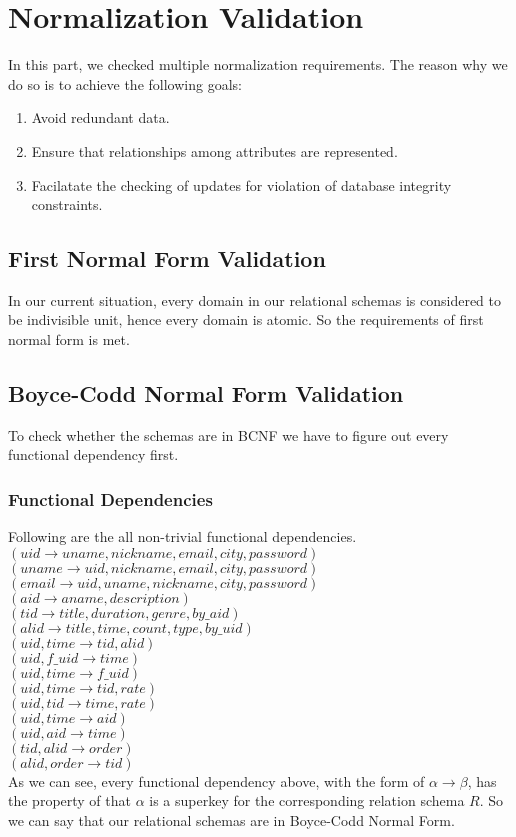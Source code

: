\documentclass[letter, 12pt]{report}
\begin{document}
	
	\section{Normalization Validation}
	In this part, we checked multiple normalization requirements. The reason why we do so is to achieve the following goals:
	\begin{enumerate}
		\item 
		Avoid redundant data.
		\item 
		Ensure that relationships among attributes are represented.
		\item 
		Facilatate the checking of updates for violation of database integrity constraints.
	\end{enumerate}
	\subsection{First Normal Form Validation}
	In our current situation, every domain in our relational schemas is considered to be indivisible unit, hence every domain is atomic. So the requirements of first normal form is met.
	\subsection{Boyce-Codd Normal Form Validation}
	To check whether the schemas are in BCNF we have to figure out every functional dependency first.
	\subsubsection{Functional Dependencies}
	Following are the all non-trivial functional dependencies.\\
	$(uid\to uname, nickname, email, city, password)$\\
	$(uname\to uid, nickname, email, city, password)$\\
	$(email\to uid, uname ,nickname, city, password)$\\
	$(aid\to aname, description)$\\
	$(tid\to title, duration, genre, by\_aid)$\\
	$(alid\to title, time, count, type, by\_uid)$\\
	$(uid, time\to tid, alid)$\\
	$(uid, f\_uid\to time)$\\
	$(uid, time\to f\_uid)$\\
	$(uid, time\to tid, rate)$\\
	$(uid, tid\to time, rate)$\\
	$(uid, time\to aid)$\\
	$(uid, aid\to time)$\\
	$(tid, alid\to order)$\\
	$(alid, order\to tid)$\\
	As we can see, every functional dependency above, with the form of $\alpha \to \beta$, has the property of that $\alpha$ is a superkey for the corresponding relation schema $R$. So we can say that our relational schemas are in Boyce-Codd Normal Form.
	
\end{document}

